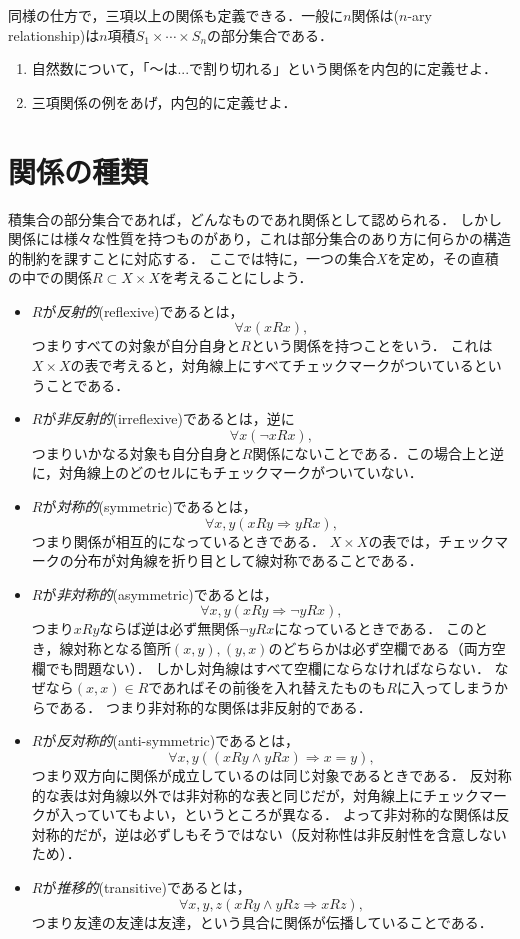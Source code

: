 \documentclass[dvipdfmx, 11pt,a4paper]{jsarticle}
\begin{document}
同様の仕方で，三項以上の関係も定義できる．一般に$n$関係は($n$-ary relationship)は$n$項積$S_1 \times \cdots \times S_n$の部分集合である．

\begin{renshu}{}{}
\begin{enumerate}
 \item 自然数について，「〜は...で割り切れる」という関係を内包的に定義せよ．
 \item 三項関係の例をあげ，内包的に定義せよ．
\end{enumerate}
\end{renshu}


\section{関係の種類}
\label{sec:relation_kinds}
積集合の部分集合であれば，どんなものであれ関係として認められる．
しかし関係には様々な性質を持つものがあり，これは部分集合のあり方に何らかの構造的制約を課すことに対応する．
ここでは特に，一つの集合$X$を定め，その直積の中での関係$R \subset X \times X$を考えることにしよう．

\begin{itemize}
 \item $R$が\emph{反射的}(reflexive)であるとは，
       \[ \forall x ( xRx ), \]
       つまりすべての対象が自分自身と$R$という関係を持つことをいう．
       これは$X \times X$の表で考えると，対角線上にすべてチェックマークがついているということである．
 \item $R$が\emph{非反射的}(irreflexive)であるとは，逆に
       \[ \forall x ( \neg xRx ), \]
       つまりいかなる対象も自分自身と$R$関係にないことである．この場合上と逆に，対角線上のどのセルにもチェックマークがついていない．
 \item $R$が\emph{対称的}(symmetric)であるとは，
       \[ \forall x, y ( xRy \Rightarrow yRx ), \]
       つまり関係が相互的になっているときである．
       $X \times X$の表では，チェックマークの分布が対角線を折り目として線対称であることである．
 \item $R$が\emph{非対称的}(asymmetric)であるとは，
       \[  \forall x, y ( xRy \Rightarrow \neg yRx ), \]
       つまり$xRy$ならば逆は必ず無関係$\neg yRx$になっているときである．
       このとき，線対称となる箇所$(x,y), (y,x)$のどちらかは必ず空欄である（両方空欄でも問題ない）．
       しかし対角線はすべて空欄にならなければならない．
       なぜなら$(x,x) \in R$であればその前後を入れ替えたものも$R$に入ってしまうからである．
       つまり非対称的な関係は非反射的である．
 \item $R$が\emph{反対称的}(anti-symmetric)であるとは，
       \[ \forall x, y (( xRy \wedge yRx)  \Rightarrow x=y), \]
       つまり双方向に関係が成立しているのは同じ対象であるときである．
       反対称的な表は対角線以外では非対称的な表と同じだが，対角線上にチェックマークが入っていてもよい，というところが異なる．
       よって非対称的な関係は反対称的だが，逆は必ずしもそうではない（反対称性は非反射性を含意しないため）．
 \item $R$が\emph{推移的}(transitive)であるとは，
       \[ \forall x, y, z  ( xRy \wedge yRz \Rightarrow xRz), \]
       つまり友達の友達は友達，という具合に関係が伝播していることである．
\end{itemize}
\end{document}
